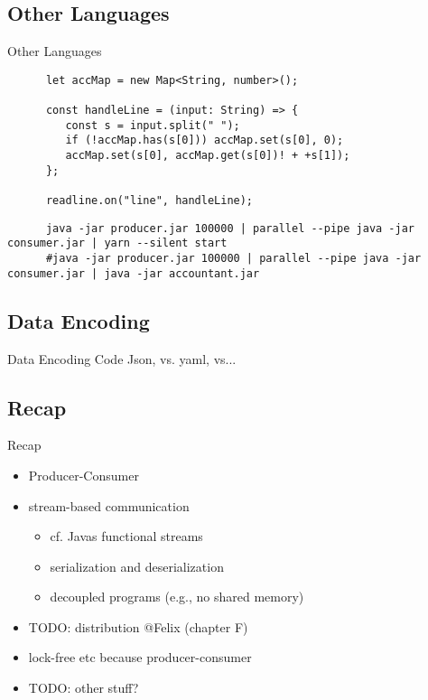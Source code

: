 \subsection{Other Languages}
\begin{frame}[fragile]{Other Languages}
   \begin{verbatim}
      let accMap = new Map<String, number>();

      const handleLine = (input: String) => {
         const s = input.split(" ");
         if (!accMap.has(s[0])) accMap.set(s[0], 0);
         accMap.set(s[0], accMap.get(s[0])! + +s[1]);
      };

      readline.on("line", handleLine);

   \end{verbatim}
   \begin{verbatim}
      java -jar producer.jar 100000 | parallel --pipe java -jar consumer.jar | yarn --silent start
      #java -jar producer.jar 100000 | parallel --pipe java -jar consumer.jar | java -jar accountant.jar
   \end{verbatim}
\end{frame}
\subsection{Data Encoding}
\begin{frame}{Data Encoding}
      Code Json, vs. yaml, vs...
\end{frame}


\subsection{Recap} %
\begin{frame}{Recap}
   \begin{itemize}[<+(1)->]
      \itemsep12pt
      \item Producer-Consumer
      \item stream-based communication \begin{itemize}
         \item cf. Javas functional streams
         \item serialization and deserialization %
         \item decoupled programs (e.g., no shared memory)
      \end{itemize}
      \item TODO: distribution @Felix (chapter F)
      \item lock-free etc because producer-consumer
      \item TODO: other stuff?
   \end{itemize}
\end{frame}


